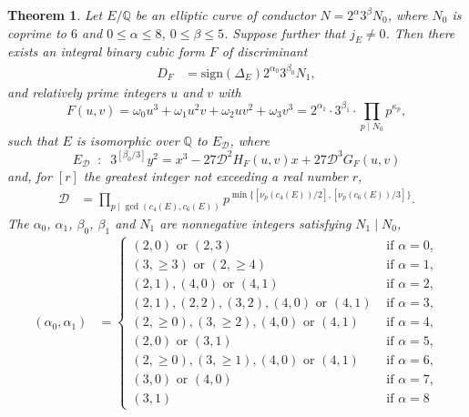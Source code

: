 \documentclass[11pt]{report}
\newtheorem{theorem}{Theorem}[section]
\theoremstyle{definition}
\begin{document}
\begin{theorem} \label{fisk}
Let $E/\mathbb{Q}$ be an elliptic curve of conductor $N=2^\alpha 3^\beta N_0$, where $N_0$ is coprime to $6$ and $0 \leq \alpha \leq 8$, $0 \leq \beta \leq 5$. Suppose further that $j_E \neq 0$.
Then there exists an integral binary cubic form $F$ of discriminant
\begin{align*}
D_F &= \text{sign}(\Delta_E) 2^{\alpha_0} 3^{\beta_0} N_1,
\end{align*}
and relatively prime integers $u$ and $v$ with
\begin{equation} \label{TM-eq}
F(u,v) =  \omega_0 u^3 + \omega_1 u^2v + \omega_2 uv^2 + \omega_3 v^3 = 2^{\alpha_1} \cdot 3^{\beta_1} \cdot \prod_{p \mid N_0} p^{\kappa_p},
\end{equation}
such that $E$ is isomorphic over $\mathbb{Q}$ to $E_{\mathcal{D} }$, where
\begin{equation} \label{curvey}
E_{\mathcal{D}} \; \; : \; \;  3^{[\beta_0/3]} y^2 = x^3 -27 \mathcal{D}^2 H_F(u,v) x +27 \mathcal{D}^3 G_F(u,v)
\end{equation}
and, for $[r]$ the greatest integer not exceeding a real number $r$,
\begin{align} \label{Dee}
\mathcal{D} &= \prod_{p \mid \gcd (c_4(E), c_6(E))} p^{\min \{ [\nu_p (c_4(E))/2], [\nu_p (c_6(E))/3] \}}.
\end{align}
The $\alpha_0$, $\alpha_1$, $\beta_0$, $\beta_1$ and $N_1$ are nonnegative integers satisfying  $N_1 \mid N_0$,
\begin{align*}
(\alpha_0, \alpha_1) &=
\begin{cases}
(2, 0)  \mbox{ or } (2,3)
    & \mbox{ if }  \alpha =0, \\
(3,\geq 3) \mbox{ or } (2,\geq 4)
    & \mbox{ if }  \alpha =1, \\
(2,1), (4,0) \mbox{ or }  (4,1)
    & \mbox{ if }  \alpha =2, \\
(2,1), (2,2), (3,2), (4,0)  \mbox{ or }  (4,1)
    & \mbox{ if }  \alpha =3, \\
(2, \geq 0), (3, \geq 2), (4,0)  \mbox{ or }  (4, 1)
    & \mbox{ if }  \alpha =4,  \\
(2, 0) \mbox{ or } (3,1)
    & \mbox{ if }  \alpha =5, \\
(2, \geq 0), (3, \geq 1), (4,0) \mbox{ or }  (4, 1)
    & \mbox{ if }  \alpha =6, \\
(3,0) \mbox{ or } (4,0)
    & \mbox{ if }  \alpha =7,  \\
(3, 1)
    & \mbox{ if }  \alpha =8
\end{cases}

\end{align*}
\end{theorem}
\end{document}
